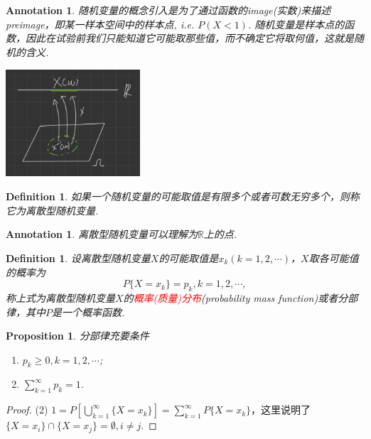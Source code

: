 \documentclass{article}
\newtheorem{proposition}[theorem]{Proposition}
\newtheorem{definition}[theorem]{Definition}
\newtheorem{annotation}[theorem]{Annotation}
\newcommand{\redt}[1]{\textcolor{red}{#1}}
\begin{document}
\begin{annotation}
\rm 随机变量的概念引入是为了通过函数的image(实数)来描述preimage，即某一样本空间中的样本点, i.e. $P(X < 1)$. 随机变量是样本点的函数，因此在试验前我们只能知道它可能取那些值，而不确定它将取何值，这就是随机的含义. 
\begin{center}
\includegraphics[width=5cm, height=4cm]{images/random_variable.jpg}
\end{center}
\end{annotation}

\begin{definition}
\rm 如果一个随机变量的可能取值是有限多个或者可数无穷多个，则称它为{\color{red}离散型随机变量}.
\end{definition}

\begin{annotation}
\rm 离散型随机变量可以理解为$\mathbb{R}$上的点.
\end{annotation}



\begin{definition}
\rm 设离散型随机变量$X$的可能取值是$x_k(k=1,2,\cdots)$，$X$取各可能值的概率为
$$
P\{X=x_k\} = p_k, k=1,2,\cdots,
$$
称上式为离散型随机变量$X$的\redt{概率(质量)分布}(probability mass function)或者分部律，其中$P$是一个概率函数.
\end{definition}

\begin{proposition}
\rm 分部律充要条件
\begin{enumerate}
	\item $p_k \geq 0,k=1,2,\cdots$;
	\item $\sum\limits_{k=1}^\infty p_k = 1$.
\end{enumerate}
\end{proposition}

\begin{proof}
{\color{red}(2)} $1 = P[\bigcup\limits_{k=1}^{\infty}\{X= x_k\}] = \sum\limits_{k=1}^{\infty} P\{X=x_k\}$，这里说明了$\{X=x_i\} \cap \{X = x_j\} = \emptyset, i \neq j$.
\end{proof}
\end{document}
